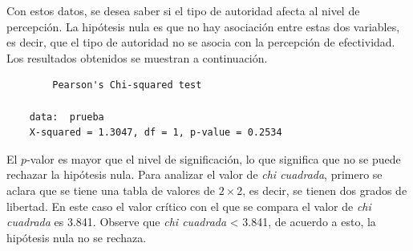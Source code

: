 \documentclass[12pt]{article}
\begin{document}
	Con estos datos, se desea saber si el tipo de autoridad afecta al nivel de percepción. La hipótesis nula es que no hay asociación entre estas dos variables, es decir, que el tipo de autoridad no se asocia con la percepción de efectividad. Los resultados obtenidos se muestran a continuación.
	\begin{verbatim}
		Pearson's Chi-squared test

	data:  prueba
	X-squared = 1.3047, df = 1, p-value = 0.2534
	\end{verbatim}
	
	El $p$-valor es mayor que el nivel de significación, lo que significa que no se puede rechazar la hipótesis nula. Para analizar el valor de {\em chi cuadrada}, primero se aclara que se tiene una tabla de valores de $2 \times 2$, es decir, se tienen dos grados de libertad. En este caso el valor crítico con el que se compara el valor de {\em chi cuadrada} es 3.841. Observe que {\em chi cuadrada} < 3.841, de acuerdo a esto, la hipótesis nula no se rechaza.
	


\end{document}
